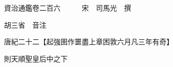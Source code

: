 










 


 
 


 

  
  
  
  
  





  
  
  
  
  
 
  

  

  
  
  



  

 
 

  
   




  

  
  


  　　資治通鑑卷二百六　　　宋　司馬光　撰

　　胡三省　音注

　　唐紀二十二【起強圉作噩盡上章困敦六月凡三年有奇】

　　則天順聖皇后中之下

